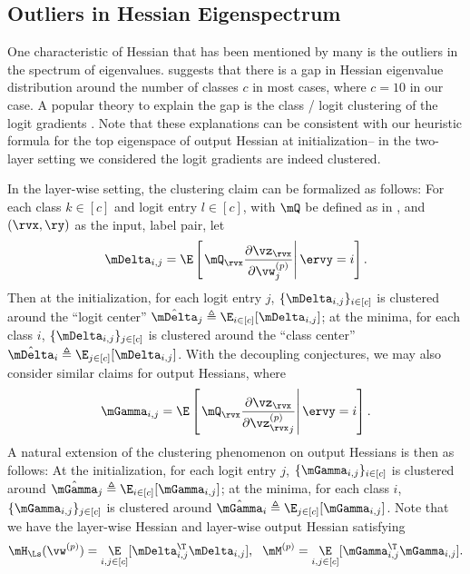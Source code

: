 \newpage
\subsection{Outliers in Hessian Eigenspectrum}
\label{sec:appendix_M_struct}
One characteristic of Hessian that has been mentioned by many is the outliers in the spectrum of eigenvalues. \citet{sagun2017empirical} suggests that there is a gap in Hessian eigenvalue distribution around the number of classes $c$ in most cases, where $c=10$ in our case. A popular theory to explain the gap is the class / logit clustering of the logit gradients \citep{fort2019emergent, papyan2019measurements, papyan2020traces}. 
Note that these explanations can be consistent with our heuristic formula for the top eigenspace of output Hessian at initialization\--- in the two-layer setting we considered the logit gradients are indeed clustered.

In the layer-wise setting, the clustering claim can be formalized as follows: For each class $k\in[c]$ and logit entry $l\in[c]$, with $\mQ$ be defined as in  , and $(\rvx, \ry)$ as the input, label pair, let
\begin{equation}
    \mDelta_{i,j} = \E\left[\left.\mQ_{\rvx}\frac{\partial \vz_{\rvx}}{\partial \vw^{(p)}_j}\right\vert\ervy=i\right].
\end{equation}
Then at the initialization, for each logit entry $j$, $\{\mDelta_{i,j}\}_{i\in[c]}$ is clustered around the ``logit center'' $\hat{\mDelta}_j \triangleq \E_{i\in[c]}[\mDelta_{i,j}]$; at the minima, for each class $i$, $\{\mDelta_{i,j}\}_{j\in[c]}$ is clustered around the ``class center''  $\hat{\mDelta}_i \triangleq \E_{j\in[c]}[\mDelta_{i,j}]$. With the decoupling conjectures, we may also consider similar claims for output Hessians, where
\begin{equation}
    \mGamma_{i,j} = \E\left[\left.\mQ_{\rvx}\frac{\partial \vz_{\rvx}}{\partial {\vz^{(p)}_{\rvx}}_j}\right\vert\ervy=i\right].
\end{equation}
A natural extension of the clustering phenomenon on output Hessians is then as follows: At the initialization, for each logit entry $j$, $ \{\mGamma_{i,j}\}_{i\in[c]}$ is clustered around $\hat{\mGamma}_j \triangleq\E_{i\in[c]}[\mGamma_{i,j}]$; at the minima, for each class $i$, $\{\mGamma_{i,j}\}_{j\in[c]}$ is clustered around $\hat{\mGamma}_i \triangleq \E_{j\in[c]}[\mGamma_{i,j}]$.
Note that we have the layer-wise Hessian and layer-wise output Hessian satisfying
\begin{equation}
    \mH_\Ls(\vw^{(p)}) = \mathop{\E}_{i,j\in[c]}[\mDelta_{i,j}^\T\mDelta_{i,j}],\ \  \mM^{(p)} = \mathop{\E}_{i,j\in[c]}[\mGamma_{i,j}^\T\mGamma_{i,j}].
\end{equation}

